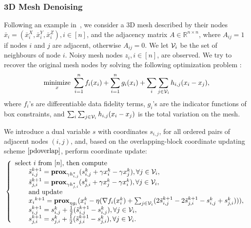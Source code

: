 \subsubsection{3D Mesh Denoising}
Following an example in~\cite{repetti2015random}, we consider a 3D mesh described by their nodes $\bar{x}_i=(\bar{x}_i^X,\bar{x}_i^Y,\bar{x}_i^Z), i\in[n]$, and the adjacency matrix $A\in\mathbb{R}^{n\times n}$, where $A_{ij} = 1$ if nodes $i$ and $j$ are adjacent, otherwise $A_{ij} = 0$. We let ${\mathcal{V}}_i$  be the set of neighbours of node $i$. Noisy mesh nodes $z_i, i \in [n]$, are observed. We try to recover the original mesh nodes by solving the following optimization problem \cite{repetti2015random}:
\begin{equation}
\Min_{x} ~\sum_{i=1}^n f_i(x_i)+\sum_{i=1}^n g_i(x_i)+\sum_{i} \sum_{j\in \cV_{i}} h_{i,j}(x_{i}-x_{j}),
\end{equation}
where $f_i$'s are differentiable data fidelity terms, $g_i$'s are the indicator functions of box constraints, and $\sum_{i} \sum_{j\in {\mathcal{V}}_{i}}h_{i,j}(x_{i}-x_{j})$ is the total variation on the mesh.

We introduce a dual variable $s$ with coordinates $s_{i,j}$, for all ordered pairs of adjacent nodes $(i,j)$, and, based on the overlapping-block coordinate updating scheme $\eqref{pdoverlap}$, perform coordinate update:
\begin{equation}
\left\{
\begin{array}{l}
\text{select $i$ from $[n]$, then compute }\\
\qquad \tilde{s}_{i,j}^{k+1}=\prox_{\gamma h_{i,j}^*} (s_{i,j}^k+\gamma x_i^k-\gamma x_j^k),\forall j\in\cV_i,\\
\qquad \tilde{s}_{j,i}^{k+1}=\prox_{\gamma h_{j,i}^*} (s_{j,i}^k+\gamma x_j^k-\gamma x_i^k),\forall j\in\cV_i,\\
\qquad \textnormal{and update}\\
\qquad {x_i}^{k+1}=\prox_{\eta g_i}(x_i^k-\eta(\nabla f_i(x_i^k)+\sum_{j\in\cV_i}(2\tilde{s}_{i,j}^{k+1}-2\tilde{s}_{j,i}^{k+1}-s_{i,j}^k+{s}_{j,i}^{k}))),\\
\qquad s_{i,j}^{k+1}=s_{i,j}^k+\frac{1}{2}(\tilde{s}_{i,j}^{k+1}-s_{i,j}^k),\forall j\in\cV_i,\\
\qquad s_{j,i}^{k+1}=s_{j,i}^k+\frac{1}{2}(\tilde{s}_{j,i}^{k+1}-s_{j,i}^k),\forall j\in\cV_i.
\end{array}
\right.\nonumber
\end{equation}
